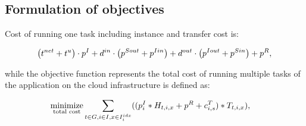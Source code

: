 {    \subsection{Formulation of objectives}
    \label{sec:workflow:problem:objective}
    
    Cost of running one task including instance and transfer cost is:

    \begin{align}
        \left(t^{net} + t^u\right) \cdot p^I + 
        d^{in} \cdot \left(p^{Sout} + p^{Iin}\right) + 
        d^{out} \cdot \left(p^{Iout} + p^{Sin}\right) + 
        p^{R},
    \end{align}

    while the objective function represents the total cost of running multiple
    tasks of the application on the cloud infrastructure is defined as:
    
    \begin{align}    
    \begin{split}
        \underset{\text{total cost}}{\text{minimize}} \sum \limits_{t \in G, i \in I, x \in I^{idx}_i}  ( & 
                    (p^I_i * H_{t,i,x} + p^{R} + c^T_{i,s})*T_{t,i,x} 
                   ),
    \end{split}
    \end{align}
      
}
